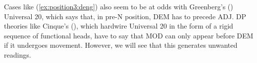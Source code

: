 \documentclass[output=paper,colorlinks,citecolor=brown]{langscibook}
\begin{document}

\ea \label{ex:allposition:deng}





\z 
\z 


\noindent Cases like (\ref{ex:position3:deng}) also seem to be at odds with Greenberg's  (\citeyear{Greenberg63c}) Universal 20, which says that, in pre-N position, DEM has to precede ADJ. DP theories like Cinque's (\citeyear{Cinque05b}), which hardwire Universal 20 in the form of a rigid  sequence of functional heads, have to say that MOD can only appear before DEM if it undergoes movement. However, we will see that this generates unwanted readings.

\end{document}

